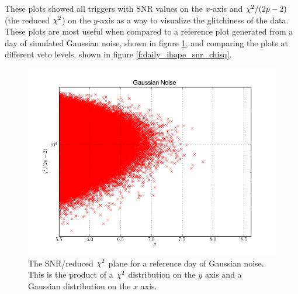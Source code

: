 
These plots showed all triggers with SNR values on the $x$-axis and
$\chi^2 / (2p-2)$ (the reduced $\chisq$) on the $y$-axis as a way to
visualize the glitchiness of the data.  These plots are most useful
when compared to a reference plot generated from a day of simulated
Gaussian noise, shown in figure \ref{f:gaussian_snr_chisq}, and
comparing the plots at different veto levels, shown in figure
\ref{f:daily_ihope_snr_chisq}.

\begin{figure}
\includegraphics[width=0.85\linewidth]{figures/detchar/GAUSSIAN_0_UNCLUSTERED_chisq.png}
\caption[SNR/reduced $\chisq$ values in Gaussian noise]{
\label{f:gaussian_snr_chisq}
The SNR/reduced $\chisq$ plane for a reference day of
Gaussian noise.  This is the product of a $\chisq$ distribution on the
$y$ axis and a Gaussian distribution on the $x$ axis.}
\end{figure}%

